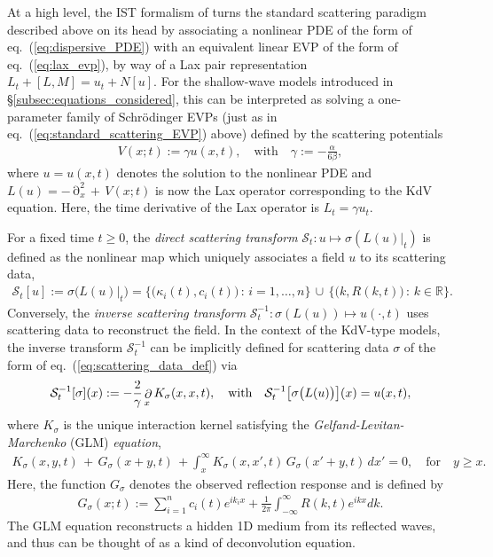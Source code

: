 \documentclass[journal=gmj]{CUP-JNL-DTM}%
\DeclareMathOperator{\pt}{\partial}
\theoremstyle{definition}
\numberwithin{equation}{section}
\begin{document}
At a high level, the IST formalism of \cite{Ablowitz.etal1974StudApplMath} turns the standard scattering paradigm described above on its head by associating a nonlinear PDE of the form of eq.~(\ref{eq:dispersive_PDE}) with an equivalent linear EVP of the form of eq.~(\ref{eq:lax_evp}), by way of a Lax pair representation $L_t + [L,M] = u_t + N[u]$. For the shallow-wave models introduced in \S\ref{subsec:equations_considered}, this can be interpreted as solving a one-parameter family of Schr\"odinger EVPs (just as in eq.~(\ref{eq:standard_scattering_EVP}) above) defined by the scattering potentials \begin{align*}
    V(x;t) := \gamma u(x,t),
    \quad \text{with} \quad
    \gamma := -\frac{\alpha}{6\beta},
\end{align*} where $u = u(x,t)$ denotes the solution to the nonlinear PDE and $L(u) = -\pt^2_{\!x} \, + \, V(x;t)$ is now the Lax operator corresponding to the KdV equation. Here, the time derivative of the Lax operator is $ L_t = \gamma u_t$.

\newpage

For a fixed time $t \geq 0$, the \textit{direct scattering transform} $\mathcal{S}_t:u \mapsto \sigma(L(u)|_t)$ is defined as the nonlinear map which uniquely associates a field $u$ to its scattering data, \begin{align}\label{eq:DST}
    \mathcal{S}_t[u]
    := \sigma\big(L(u)|_t\big)
    = \big\{\big(\kappa_i(t), c_i(t)\big) \, : \, i=1, \dots,n\big\} \, \cup \, \big\{ \big(k, R(k,t)\big) \, : \, k \in \mathbb{R} \big\}.
\end{align} Conversely, the \textit{inverse scattering transform} $\mathcal{S}^{-1}_t:\sigma(L(u)) \mapsto u(\cdot,t)$ uses scattering data to reconstruct the field. In the context of the KdV-type models, the inverse transform $\mathcal{S}^{-1}_t$ can be implicitly defined for scattering data $\sigma$ of the form of eq.~(\ref{eq:scattering_data_def}) via \begin{align}\label{eq:IST}
    \vspace{-1mm}
    \mathcal{S}^{-1}_t[ \sigma ](x)
    := -\frac{2}{\gamma} \pt_{\!x} K_{\sigma}(x,x,t),
    \quad \text{with} \quad
    \mathcal{S}^{-1}_t\big[ \sigma\big(L(u)\big) \big](x) = u(x,t),
\end{align} where $K_{\sigma}$ is the unique interaction kernel satisfying the \textit{Gelfand-Levitan-Marchenko} (GLM) \textit{equation}, \begin{align}\label{eq:GLM_eqn}
    K_{\sigma}(x,y,t) \, + \, G_{\!\sigma}(x+y,t) \, + \int_x^{\infty} K_{\sigma}(x,x',t) \, G_{\!\sigma}(x' + y, t) \, dx' = 0,
    \quad \text{for} \quad
    y \geq x.
\end{align} Here, the function $G_{\!\sigma}$ denotes the observed reflection response and is defined by \begin{align*}
    G_{\!\sigma}(x;t) := \sum_{i=1}^{n} c_i(t) e^{ik_ix} + \frac{1}{2\pi} \int_{-\infty}^{\infty} R(k,t) e^{ikx} dk.
\end{align*} The GLM equation reconstructs a hidden 1D medium from its reflected waves, and thus can be thought of as a kind of deconvolution equation.
\end{document}
